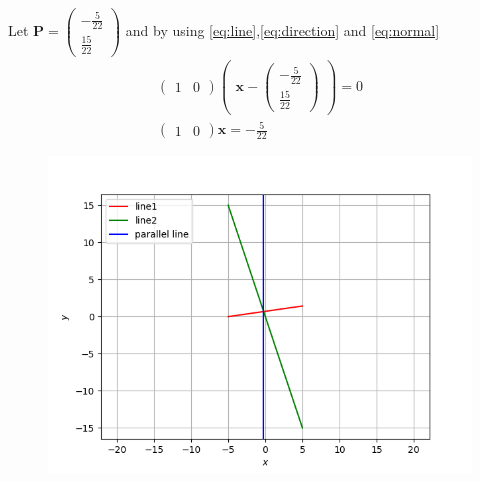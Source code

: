 \documentclass[12pt]{article}
\newcommand{\myvec}[1]{\ensuremath{\begin{pmatrix}#1\end{pmatrix}}}
\let\vec\mathbf
\begin{document}
Let $\vec{P}=\myvec{-\frac{5}{22}\\[1pt] \frac{15}{22}}$ and by using \eqref{eq:line},\eqref{eq:direction} and \eqref{eq:normal}
\begin{align}
    \myvec{1&0}\myvec{\vec{x}-\myvec{-\frac{5}{22}\\[1pt] \frac{15}{22}}}=0\\
    \myvec{1&0}\vec{x}=-\frac{5}{22}
\end{align}
\begin{figure}[H]
	\begin{center} 
	    \includegraphics[width=\columnwidth]{figs/line.png}
	\end{center}
\caption{}
\label{fig:Fig3}
\end{figure}
\end{document}
